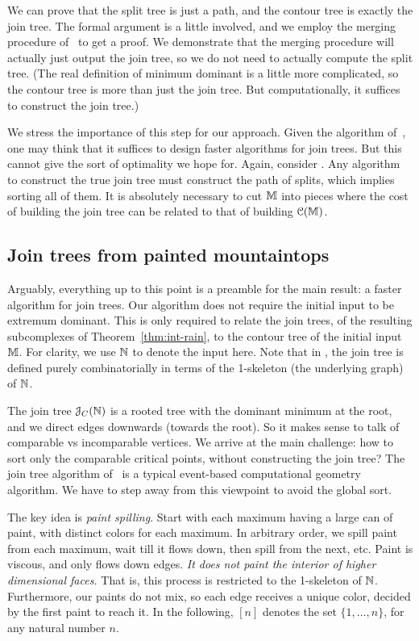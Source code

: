 {We can prove that the split tree is just a path, and the contour tree is exactly
the join tree. The formal argument is a little involved, and we employ the merging procedure
of~\cite{csa-cctad-00} to get a proof. We demonstrate that the merging procedure will
actually just output the join tree, so we do not need to actually compute the split tree.
(The real definition of minimum dominant is a little more complicated,
so the contour tree is more than just the join tree. But computationally, it suffices
to construct the join tree.)

We stress the importance of this step for our approach. Given the algorithm of~\cite{csa-cctad-00},
one may think that it suffices to design faster algorithms for join trees. But this
cannot give the sort of optimality we hope for. Again, consider . Any algorithm
to construct the true join tree must construct the path of splits, which implies
sorting all of them. It is absolutely necessary to cut $\mathbb{M}$ into pieces where the cost
of building the join tree can be related to that of building ${\cal C}(\mathbb{M})$.

\subsection{Join trees from painted mountaintops} \label{sec:join-paint}

Arguably, everything up to this point is a preamble for the main result: a faster
algorithm for join trees. Our algorithm does not require the initial input to be extremum
dominant. This is only required to relate the join trees, of the resulting subcomplexes of Theorem~\ref{thm:int-rain}, to the contour tree of the initial input $\mathbb{M}$.
For clarity, we use $\mathbb{N}$ to denote the input here. Note that in ,
the join tree is defined purely combinatorially in terms of the 1-skeleton (the underlying graph) of $\mathbb{N}$.

The join tree ${\cal J}_C(\mathbb{N})$ is a rooted tree with the dominant minimum at the root, and we direct edges downwards (towards the root). So it makes sense to talk
of comparable vs incomparable vertices.
We arrive at the main challenge: how to sort only the comparable critical points, without
constructing the join tree? The join tree algorithm of~\cite{csa-cctad-00} is a typical event-based
computational geometry algorithm. We have to step away from this viewpoint to avoid the global sort.

The key idea is \emph{paint spilling}. Start with each maximum having a large can of paint, with distinct
colors for each maximum. In arbitrary order, we spill paint from each maximum, wait till it flows down,
then spill from the next, etc. Paint is viscous, and only flows down edges. \emph{It does not
paint the interior of higher dimensional faces.} That is, this process is restricted to the 1-skeleton of $\mathbb{N}$.
Furthermore, our paints do not mix, so each edge receives a unique color, decided by the first
paint to reach it.  In the following, $[n]$ denotes the set $\{1, \ldots, n\}$, for any natural number $n$.

}
